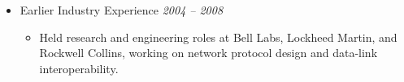 \begin{itemize}
    \item Earlier Industry Experience
    \hfill {\it 2004 -- 2008}
    \begin{itemize}
        \item Held research and engineering roles at Bell Labs, Lockheed Martin,
        and Rockwell Collins,
        working on network protocol design and data-link interoperability.
    \end{itemize}


\end{itemize}
